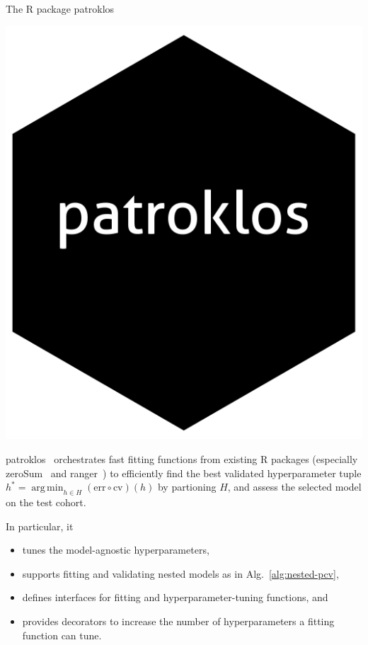 \documentclass[10pt, aspectratio=169]{beamer}
\DeclareMathOperator*{\argmin}{arg\,min}
\begin{document}
\begin{frame}{The R package patroklos}
  \begin{minipage}{0.15\textwidth}
    \centering
    \includegraphics[width=\textwidth]{figs/logo.png}
  \end{minipage}
  \hfill
  \begin{minipage}{0.8\textwidth}
    \raggedright
    patroklos~\cite{patroklos} orchestrates fast fitting functions from existing 
    R packages (especially zeroSum~\cite{zerosumR} and ranger~\citep{ranger-gh}) 
    to efficiently find the best validated hyperparameter tuple
    $h^* = \argmin_{h \in H} (\text{err} \circ \text{cv})(h)$ by partioning 
    $H$, and assess the selected model on the test cohort.
  \end{minipage}

  \pause
  In particular, it 
  \begin{itemize}
    \item tunes the model-agnostic hyperparameters,
    \item supports fitting and validating nested models as in Alg.~\ref{alg:nested-pcv},
    \item defines interfaces for fitting and hyperparameter-tuning functions, and 
    \item provides decorators to increase the number of hyperparameters  
      a fitting function can tune.
  \end{itemize}
\end{frame}
\end{document}
